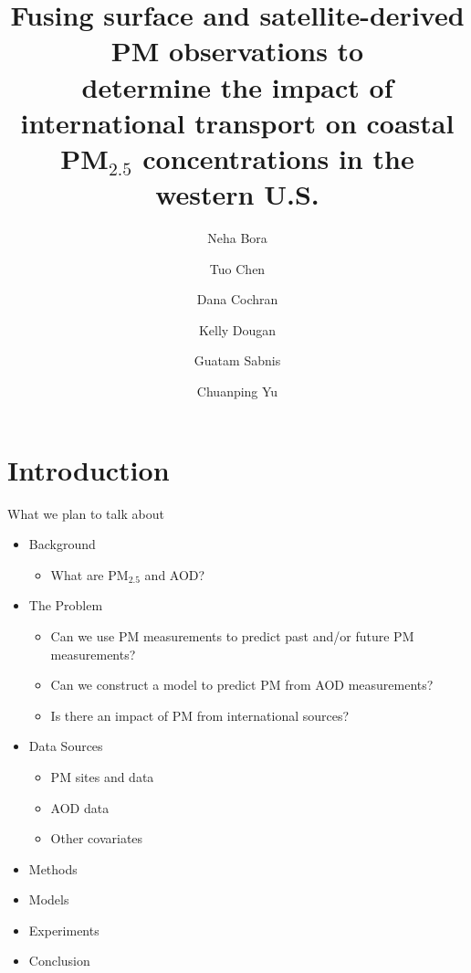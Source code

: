 \documentclass[notheorems,envcountsect,allowframebreaks,xcolor=svgnames,8pt]{beamer}
\title
{Fusing surface and satellite-derived PM observations to \\ determine the impact of international transport on coastal PM$_{2.5}$ concentrations in the western U.S.}
\author
{Neha Bora \and Tuo Chen \and Dana Cochran \and Kelly Dougan \and Guatam Sabnis \and Chuanping Yu}
\institute[SAMSI]
{Industrial Math/Stat Modeling Workshop \\ Environmental Protection Agency}
\begin{document}
\begin{frame}
\titlepage
\end{frame}

\section*{Introduction}
\begin{frame}{What we plan to talk about}
\begin{itemize}
\item Background

\begin{itemize}
\item What are PM$_{2.5}$ and AOD?
\end{itemize}

\item The Problem
\begin{itemize}
\item Can we use PM measurements to predict past and/or future PM measurements?
\item Can we construct a model to predict PM from AOD measurements?
\item Is there an impact of PM from international sources?
\end{itemize}

\item Data Sources
\begin{itemize}
\item PM sites and data
\item AOD data
\item Other covariates
\end{itemize}

\item Methods

\item Models

\item Experiments

\item Conclusion


\end{itemize}

\end{frame}
\end{document}
